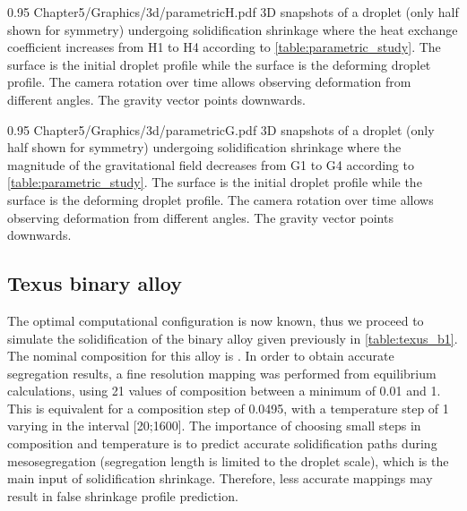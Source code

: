 \begin{figureth}
{0.95}
{Chapter5/Graphics/3d/parametricH.pdf}
{3D snapshots of a droplet (only half shown for symmetry) undergoing solidification shrinkage where the heat exchange coefficient 
increases from H1 to H4 according to \cref{table:parametric_study}. The  surface is the initial droplet profile while the  surface
is the deforming droplet profile. The camera rotation over time allows observing deformation from different angles. The gravity vector points downwards.}
\label{fig:parametricH}
\end{figureth}

\begin{figureth}
{0.95}
{Chapter5/Graphics/3d/parametricG.pdf}
{3D snapshots of a droplet (only half shown for symmetry) undergoing solidification shrinkage where the magnitude of the gravitational field
decreases from G1 to G4 according to \cref{table:parametric_study}. The  surface is the initial droplet profile while the  surface
is the deforming droplet profile. The camera rotation over time allows observing deformation from different angles.
The gravity vector points downwards.}
\label{fig:parametricG}
\end{figureth}


\subsection{Texus binary alloy}

The optimal computational configuration is now known, thus we proceed to simulate the solidification of the binary alloy given previously in \cref{table:texus_b1}.
The nominal composition for this alloy is . In order to obtain accurate segregation results, 
a fine resolution mapping was performed
from equilibrium calculations, using 21 values of composition between a minimum of \SI{0.01}{\ucomposition} and \SI{1}{\ucomposition}. This is 
equivalent for a composition step of \SI{0.0495}{\ucomposition}, with a temperature step of \SI{1}{\udegC} varying in the interval [\SI{20}{\udegC};\SI{1600}{\udegC}].
The importance of choosing small steps in composition and temperature is to predict accurate solidification paths during mesosegregation (segregation length is limited to the droplet scale), 
which is the main input of solidification shrinkage. Therefore, less accurate mappings may result in false shrinkage profile prediction. 

